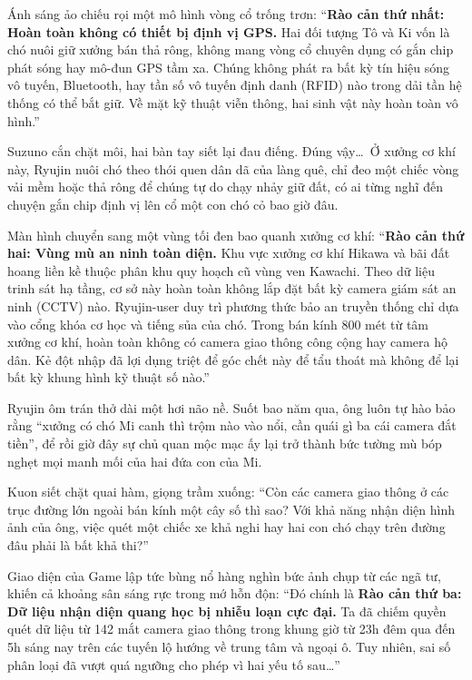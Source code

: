 \documentclass[../main.tex]{subfiles}
\begin{document}
Ánh sáng ảo chiếu rọi một mô hình vòng cổ trống trơn: ``\textbf{Rào cản thứ nhất: Hoàn toàn không có thiết bị định vị GPS.} Hai đối tượng Tô và Ki vốn là chó nuôi giữ xưởng bán thả rông, không mang vòng cổ chuyên dụng có gắn chip phát sóng hay mô-đun GPS tầm xa. Chúng không phát ra bất kỳ tín hiệu sóng vô tuyến, Bluetooth, hay tần số vô tuyến định danh (RFID) nào trong dải tần hệ thống có thể bắt giữ. Về mặt kỹ thuật viễn thông, hai sinh vật này hoàn toàn vô hình.''

Suzuno cắn chặt môi, hai bàn tay siết lại đau điếng. Đúng vậy\dots\ Ở xưởng cơ khí này, Ryujin nuôi chó theo thói quen dân dã của làng quê, chỉ đeo một chiếc vòng vải mềm hoặc thả rông để chúng tự do chạy nhảy giữ đất, có ai từng nghĩ đến chuyện gắn chip định vị lên cổ một con chó cỏ bao giờ đâu.

Màn hình chuyển sang một vùng tối đen bao quanh xưởng cơ khí: ``\textbf{Rào cản thứ hai: Vùng mù an ninh toàn diện.} Khu vực xưởng cơ khí Hikawa và bãi đất hoang liền kề thuộc phân khu quy hoạch cũ vùng ven Kawachi. Theo dữ liệu trinh sát hạ tầng, cơ sở này hoàn toàn không lắp đặt bất kỳ camera giám sát an ninh (CCTV) nào. Ryujin-user duy trì phương thức bảo an truyền thống chỉ dựa vào cổng khóa cơ học và tiếng sủa của chó. Trong bán kính 800 mét từ tâm xưởng cơ khí, hoàn toàn không có camera giao thông công cộng hay camera hộ dân. Kẻ đột nhập đã lợi dụng triệt để góc chết này để tẩu thoát mà không để lại bất kỳ khung hình kỹ thuật số nào.''

Ryujin ôm trán thở dài một hơi não nề. Suốt bao năm qua, ông luôn tự hào bảo rằng ``xưởng có chó Mi canh thì trộm nào vào nổi, cần quái gì ba cái camera đắt tiền'', để rồi giờ đây sự chủ quan mộc mạc ấy lại trở thành bức tường mù bóp nghẹt mọi manh mối của hai đứa con của Mi.

Kuon siết chặt quai hàm, giọng trầm xuống: ``Còn các camera giao thông ở các trục đường lớn ngoài bán kính một cây số thì sao? Với khả năng nhận diện hình ảnh của ông, việc quét một chiếc xe khả nghi hay hai con chó chạy trên đường đâu phải là bất khả thi?''

Giao diện của Game lập tức bùng nổ hàng nghìn bức ảnh chụp từ các ngã tư, khiến cả khoảng sân sáng rực trong mớ hỗn độn: ``Đó chính là \textbf{Rào cản thứ ba: Dữ liệu nhận diện quang học bị nhiễu loạn cực đại.} Ta đã chiếm quyền quét dữ liệu từ 142 mắt camera giao thông trong khung giờ từ 23h đêm qua đến 5h sáng nay trên các tuyến lộ hướng về trung tâm và ngoại ô. Tuy nhiên, sai số phân loại đã vượt quá ngưỡng cho phép vì hai yếu tố sau\dots''
\end{document}
